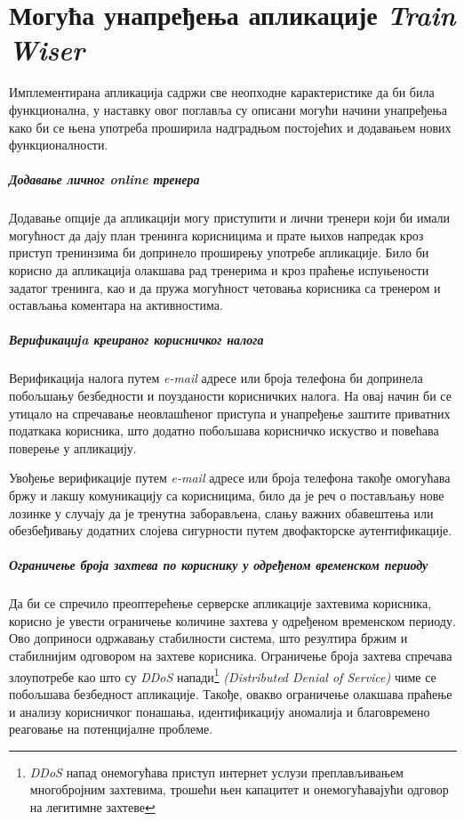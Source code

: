 \documentclass[12pt,oneside]{memoir}
\begin{document}
\chapter{Могућа унапређења апликације \textit{Train Wiser}}\label{chapter:improvement-possibilities}

Имплементирана апликација садржи све неопходне карактеристике да би била функционална, у наставку овог поглавља су описани могући начини унапређења како би се њена употреба проширила надградњом постојећих и додавањем нових функционалности.

\paragraph{Додавање личног \textit{online} тренера}

Додавање опције да апликацији могу приступити и лични тренери који би имали могућност да дају план тренинга корисницима и прате њихов напредак кроз приступ тренинзима би допринело проширењу употребе апликације. Било би корисно да апликација олакшава рад тренерима и кроз праћење испуњености задатог тренинга, као и да пружа могућност четовања корисника са тренером и остављања коментара на активностима.

\paragraph{Верификацијa креираног корисничког налога}

Верификација налога путем \textit{e-mail} адресе или броја телефона би допринела побољшању безбедности и поузданости корисничких налога. На овај начин би се утицало на спречавање неовлашћеног приступа и унапређење заштите приватних податкака корисника, што додатно побољшава корисничко искуство и повећава поверење у апликацију.

Увођење верификације путем \textit{e-mail} адресе или броја телефона такође омогућава бржу и лакшу комуникацију са корисницима, било да је реч о постављању нове лозинке у случају да је тренутна заборављена, слању важних обавештења или обезбеђивању додатних слојева сигурности путем двофакторске аутентификације.

\paragraph{Ограничење броја захтева по кориснику у одређеном временском периоду}

Да би се спречило преоптерећење серверске апликације захтевима корисника, корисно је увести ограничење количине захтева у одређеном временском периоду. Ово доприноси одржавању стабилности система, што резултира бржим и стабилнијим одговором на захтеве корисника. Ограничење броја захтева спречава злоупотребе као што су \textit{DDoS} напади\footnote{\textit{DDoS} напад онемогућава приступ интернет услузи преплављивањем многобројним захтевима, трошећи њен капацитет и онемогућавајући одговор на легитимне захтеве} \textit{(Distributed Denial of Service)} чиме се побољшава безбедност апликације. Такође, овакво ограничење олакшава праћење и анализу корисничког понашања, идентификацију аномалија и благовремено реаговање на потенцијалне проблеме.
\end{document}
